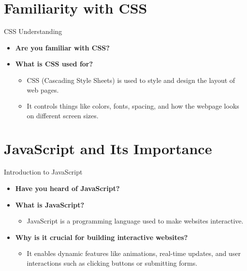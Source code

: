 \documentclass{beamer}
\begin{document}
\section{Familiarity with CSS}
\begin{frame}{CSS Understanding}
    \begin{itemize}
        \item \textbf{Are you familiar with CSS?}
        \item \textbf{What is CSS used for?}
        \begin{itemize}
            \item CSS (Cascading Style Sheets) is used to style and design the layout of web pages.
            \item It controls things like colors, fonts, spacing, and how the webpage looks on different screen sizes.
        \end{itemize}
    \end{itemize}
\end{frame}

\section{JavaScript and Its Importance}
\begin{frame}{Introduction to JavaScript}
    \begin{itemize}
        \item \textbf{Have you heard of JavaScript?}
        \item \textbf{What is JavaScript?}
        \begin{itemize}
            \item JavaScript is a programming language used to make websites interactive.
        \end{itemize}
        \item \textbf{Why is it crucial for building interactive websites?}
        \begin{itemize}
            \item It enables dynamic features like animations, real-time updates, and user interactions such as clicking buttons or submitting forms.
        \end{itemize}
    \end{itemize}
\end{frame}

\end{document}
